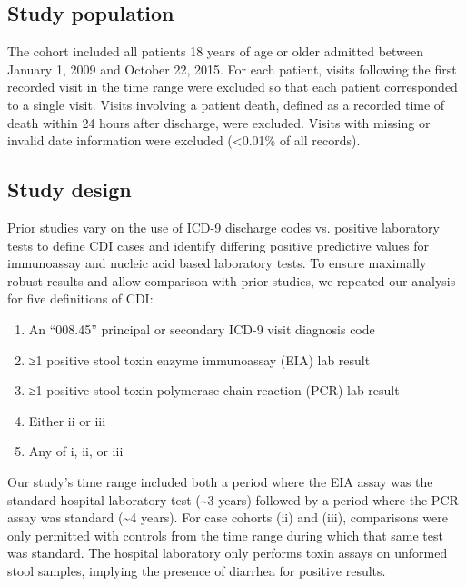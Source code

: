 \subsection{Study population}

The cohort included all patients 18 years of age or older admitted between January 1, 2009 and October 22, 2015. For each patient, visits following the first recorded visit in the time range were excluded so that each patient corresponded to a single visit. Visits involving a patient death, defined as a recorded time of death within 24 hours after discharge, were excluded. Visits with missing or invalid date information were excluded (<0.01\% of all records). 

\subsection{Study design}

Prior studies vary on the use of ICD-9 discharge codes vs. positive laboratory tests to define CDI cases\autocite{Gabriel2014,Zhang2016} and identify differing positive predictive values for immunoassay and nucleic acid based laboratory tests.\autocite{Bagdasarian2015,Moehring2013,Polage2015} To ensure maximally robust results and allow comparison with prior studies, we repeated our analysis for five definitions of CDI:

\begin{enumerate}[label=(\roman*),noitemsep,labelindent=2em,leftmargin=!]
\item An “008.45” principal or secondary ICD-9 visit diagnosis code
\item ≥1 positive stool toxin enzyme immunoassay (EIA) lab result
\item ≥1 positive stool toxin polymerase chain reaction (PCR) lab result
\item Either ii or iii
\item Any of i, ii, or iii
\end{enumerate}

Our study’s time range included both a period where the EIA assay was the standard hospital laboratory test (\textasciitilde{}3 years) followed by a period where the PCR assay was standard (\textasciitilde{}4 years). For case cohorts (ii) and (iii), comparisons were only permitted with controls from the time range during which that same test was standard. The hospital laboratory only performs toxin assays on unformed stool samples, implying the presence of diarrhea for positive results.

